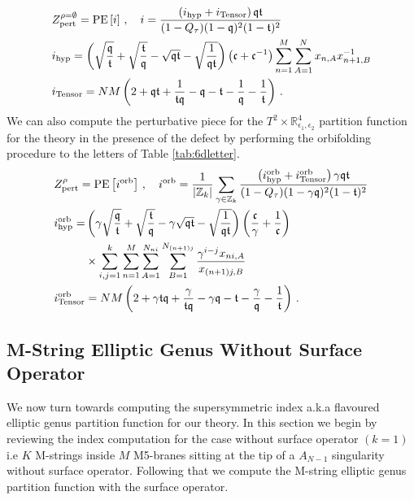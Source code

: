 \documentclass[main.tex]{subfiles}
\begin{document}
\begin{align}
&\label{eqn:pertpi}Z^{\rho=\emptyset}_{\text{pert}}=\operatorname{\mathrm{PE}}\left[i\right]\,,\quad i=\frac{\left(i_{\text{hyp}}+i_{\text{Tensor}}\right)\mathfrak{q}\mathfrak{t}}{(1-Q_{\tau})(1-\mathfrak{q})^2(1-\mathfrak{t})^2}\\
&i_{\text{hyp}}= \left(\sqrt{\frac{\mathfrak{q}}{\mathfrak{t}}}+\sqrt{\frac{\mathfrak{t}}{\mathfrak{q}}}-\sqrt{\mathfrak{q}\mathfrak{t}}-\sqrt{\frac{1}{\mathfrak{q}\mathfrak{t}}}\right)\left(\mathfrak{c}+\mathfrak{c}^{-1}\right)\sum_{n=1}^M\sum_{A=1}^Nx_{n,A}x_{n+1,B}^{-1}\\
&i_{\text{Tensor}}= NM\left(2+\mathfrak{q}\mathfrak{t}+\frac{1}{\mathfrak{t}\mathfrak{q}}-\mathfrak{q}-\mathfrak{t}-\frac{1}{\mathfrak{q}}-\frac{1}{\mathfrak{t}}\right)\,.
\end{align}
We can also compute the perturbative piece for the $T^2\times\mathbb{R}^4_{\epsilon_1,\epsilon_2}$ partition function for the theory in the presence of the defect by performing the orbifolding procedure to the letters of Table \ref{tab:6dletter}. 
\begin{align}
&\label{eqn:pertpiorb}Z^{\rho}_{\text{pert}}=\operatorname{\mathrm{PE}}\left[i^{\text{orb}}\right]\,,\quad i^{\text{orb}}=\frac{1}{|\mathbb{Z}_k|}\sum_{\gamma\in\mathbb{Z}_k}\frac{\left(i^{\text{orb}}_{\text{hyp}}+i^{\text{orb}}_{\text{Tensor}}\right)\gamma\mathfrak{q}\mathfrak{t}}{(1-Q_{\tau})(1-\gamma\mathfrak{q})^2(1-\mathfrak{t})^2}\\
&\begin{aligned}i^{\text{orb}}_{\text{hyp}}=& \left(\gamma\sqrt{\frac{\mathfrak{q}}{\mathfrak{t}}}+\sqrt{\frac{\mathfrak{t}}{\mathfrak{q}}}-\gamma\sqrt{\mathfrak{q}\mathfrak{t}}-\sqrt{\frac{1}{\mathfrak{q}\mathfrak{t}}}\right)\left(\frac{\mathfrak{c}}{\gamma}+\frac{1}{\mathfrak{c}}\right)\\
&\times\sum_{i,j=1}^k\sum_{n=1}^M\sum_{A=1}^{N_{ni}}\sum_{B=1}^{N_{(n+1)j}}\frac{\gamma^{i-j}x_{ni,A}}{x_{(n+1)j,B}}\end{aligned}\\
&i^{\text{orb}}_{\text{Tensor}}= NM\left(2+\gamma\mathfrak{t}\mathfrak{q}+\frac{\gamma}{\mathfrak{t}\mathfrak{q}}-\gamma\mathfrak{q}-\mathfrak{t}-\frac{\gamma}{\mathfrak{q}}-\frac{1}{\mathfrak{t}}\right)\,.
\end{align}
\subsection{M-String Elliptic Genus Without Surface Operator}\label{sec:nodefect}
We now turn towards computing the supersymmetric index a.k.a flavoured elliptic genus partition function for our theory. In this section we begin by reviewing the index computation for the case without surface operator $(k=1)$ i.e $K$ M-strings inside $M$ M5-branes sitting at the tip of a $A_{N-1}$ singularity without surface operator. Following that we compute the M-string elliptic genus partition function with the surface operator.
\end{document}
